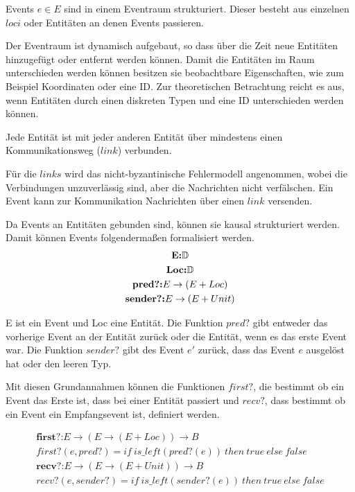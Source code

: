 \begin{defi}
  Events $e\in E$ sind in einem Eventraum strukturiert. Dieser besteht
  aus einzelnen $loci$ oder Entitäten an denen Events passieren.
\end{defi}

Der Eventraum ist dynamisch aufgebaut, so dass über die Zeit neue Entitäten
hinzugefügt oder entfernt werden können. Damit die Entitäten im Raum
unterschieden werden können besitzen sie beobachtbare Eigenschaften, wie zum
Beispiel Koordinaten oder eine ID. Zur theoretischen Betrachtung reicht es aus,
wenn Entitäten durch einen diskreten Typen und eine ID unterschieden werden können.~\cite{bickford2005causal}

\begin{defi}
  Jede Entität ist mit jeder anderen Entität über mindestens
  einen Kommunikationsweg ($link$) verbunden.
\end{defi}

Für die $links$ wird das nicht-byzantinische Fehlermodell angenommen,
wobei die Verbindungen unzuverlässig sind, aber die Nachrichten nicht
verfälschen. Ein Event kann zur Kommunikation Nachrichten über einen
$link$ versenden.

Da Events an Entitäten gebunden sind, können sie kausal strukturiert werden.
Damit können Events folgendermaßen formalisiert werden.
\begin{gather*}
  \textbf{E:}\mathbb{D}\notag\\
  \textbf{Loc:}\mathbb{D}\\
  \textbf{pred?:} E\rightarrow (E+Loc)\\
  \textbf{sender?:} E\rightarrow (E+Unit)
\end{gather*}

E ist ein Event und Loc eine Entität. Die Funktion $pred?$ gibt entweder das
vorherige Event an der Entität zurück oder die Entität, wenn es das erste Event
war. Die Funktion $sender?$ gibt des Event $e'$ zurück, dass das Event $e$
ausgelöst hat oder den leeren Typ.~\cite{bickford2005causal}

Mit diesen Grundannahmen können die Funktionen $first?$, die bestimmt ob
ein Event das Erste ist, dass bei einer Entität passiert und $recv?$,
dass bestimmt ob ein Event ein Empfangsevent ist, definiert werden.

\begin{gather*}
  \textbf{first?:}E\rightarrow (E\rightarrow (E+Loc))\rightarrow B\\
  first?(e,pred?) = if\ is\_left(pred?(e))\ then\ true\ else\ false\\
  \textbf{recv?:}E\rightarrow (E\rightarrow (E+Unit))\rightarrow B\\
  recv?(e,sender?) = if\ is\_left(sender?(e))\ then\ true\ else\ false\\
\end{gather*}

